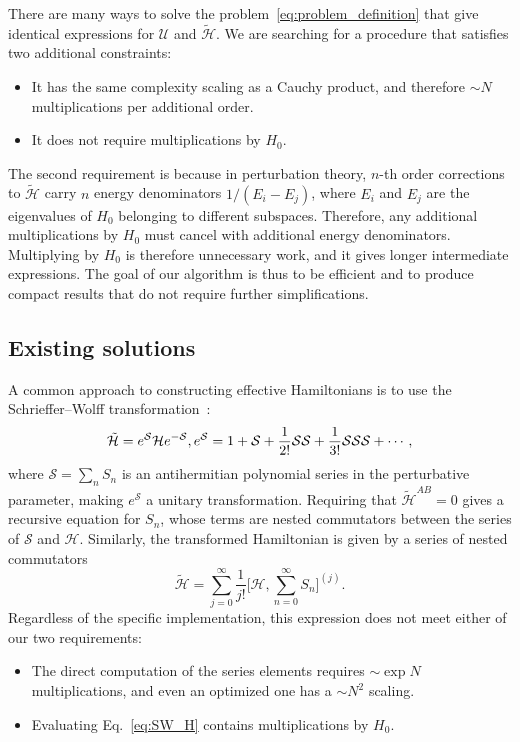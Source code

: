 There are many ways to solve the problem~\eqref{eq:problem_definition} that give identical expressions for $\mathcal{U}$ and $\tilde{\mathcal{H}}$.
We are searching for a procedure that satisfies two additional constraints:
%
\begin{itemize}
    \item It has the same complexity scaling as a Cauchy product, and therefore
    $\sim N$ multiplications per additional order.
    \item It does not require multiplications by $H_0$.
\end{itemize}
%
The second requirement is because in perturbation theory, $n$-th order corrections to $\tilde{\mathcal{H}}$ carry $n$ energy denominators $1/(E_i - E_j)$, where $E_i$ and $E_j$ are the eigenvalues of $H_0$ belonging to different subspaces.
Therefore, any additional multiplications by $H_0$ must cancel with additional energy denominators.
Multiplying by $H_0$ is therefore unnecessary work, and it gives longer intermediate expressions.
The goal of our algorithm is thus to be efficient and to produce compact results that do not require further simplifications.

\subsection{Existing solutions}
A common approach to constructing effective Hamiltonians is to use the Schrieffer--Wolff transformation~\cite{Schrieffer_1966}:
%
\begin{equation}
\tilde{\mathcal{H}} = e^\mathcal{S} \mathcal{H} e^{-\mathcal{S}}, \\
e^{\mathcal{S}} = 1 + \mathcal{S} + \frac{1}{2!} \mathcal{S} \mathcal{S}
+ \frac{1}{3!} \mathcal{S} \mathcal{S} \mathcal{S} + \cdots,
\end{equation}
%
where $\mathcal{S} = \sum_n S_n$ is an antihermitian polynomial series in the perturbative parameter, making $e^\mathcal{S}$ a unitary transformation.
Requiring that $\tilde{\mathcal{H}}^{AB} = 0$ gives a recursive equation for $S_n$, whose terms are nested commutators between the series of $\mathcal{S}$ and $\mathcal{H}$.
Similarly, the transformed Hamiltonian is given by a series of nested commutators
%
\begin{equation}
\label{eq:SW_H}
\tilde{\mathcal{H}} = \sum_{j=0}^\infty \frac{1}{j!} \Big [\mathcal{H}, \sum_{n=0}^{\infty} S_n \Big ]^{(j)}.
\end{equation}
%
Regardless of the specific implementation, this expression does not meet either of our two requirements:
\begin{itemize}
  \item The direct computation of the series elements requires $\sim \exp N$ multiplications, and even an optimized one has a $\sim N^2$ scaling.
  \item Evaluating Eq.~\eqref{eq:SW_H} contains multiplications by $H_0$.
\end{itemize}

